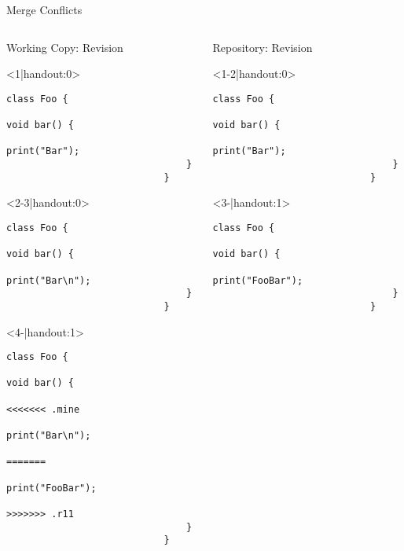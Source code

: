 \begin{frame}[fragile]{Merge Conflicts}	%
	\begin{columns}[T, onlytextwidth]
		\begin{column}{0.6\linewidth}
			\begin{columns}[T]
				\begin{column}{0.5\linewidth}
					Working Copy: Revision \only<4>{\emph{11$^*$}}\\[2mm]
					
					\begin{onlyenv}<1|handout:0>
						\begin{lstlisting}[style=java,basicstyle=\fontfamily{pcr}\small\selectfont,numbers=none,escapechar=|]
							class Foo {
								void bar() {
									print("Bar");
								}
							}	
						\end{lstlisting}
					\end{onlyenv}
					\begin{onlyenv}
						\begin{lstlisting}[style=java,basicstyle=\fontfamily{pcr}\small\selectfont,numbers=none,escapechar=|]
							class Foo {
								void bar() {
									print("Bar\n");
								}
							}
						\end{lstlisting}
					\end{onlyenv}
					\begin{onlyenv}
						\begin{lstlisting}[style=java,basicstyle=\fontfamily{pcr}\small\selectfont,numbers=none,escapechar=|]
							class Foo {
								void bar() {		
									<<<<<<< .mine
									print("Bar\n");
									=======
									print("FooBar");
									>>>>>>> .r11
								}
							}	
						\end{lstlisting}
					\end{onlyenv}
				\end{column}
				\begin{column}{0.5\linewidth}					
					Repository: Revision \only<3->{\emph{11}}
					
					\begin{onlyenv}
						\begin{lstlisting}[style=java,basicstyle=\fontfamily{pcr}\small\selectfont,numbers=none,escapechar=|]
							class Foo {
								void bar() {
									print("Bar");
								}
							}
						\end{lstlisting}
					\end{onlyenv}
					\begin{onlyenv}
						\begin{lstlisting}[style=java,basicstyle=\fontfamily{pcr}\small\selectfont,numbers=none,escapechar=|]
							class Foo {
								void bar() {
									print("FooBar");
								}
							}
						\end{lstlisting}
					\end{onlyenv}
				\end{column}
			\end{columns}
			

\end{column}
\end{columns}
\end{frame}
